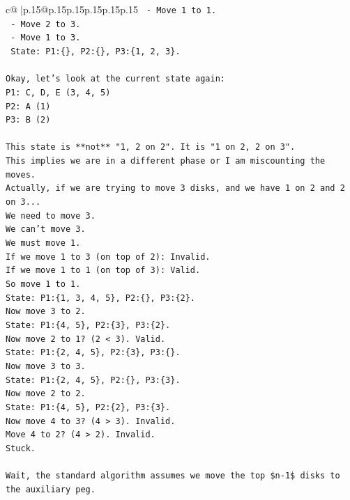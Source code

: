 \documentclass{article}
\begin{document}
{\begin{supertabular}{c@{$\;$}|p{.15\linewidth}@{}p{.15\linewidth}p{.15\linewidth}p{.15\linewidth}p{.15\linewidth}p{.15\linewidth}}
{{{\texttt{   {-} Move 1 to 1.} \\
\texttt{   {-} Move 2 to 3.} \\
\texttt{   {-} Move 1 to 3.} \\
\texttt{   State: P1:\{\}, P2:\{\}, P3:\{1, 2, 3\}.} \\
\\ 
\texttt{Okay, let's look at the current state again:} \\
\texttt{P1: C, D, E (3, 4, 5)} \\
\texttt{P2: A (1)} \\
\texttt{P3: B (2)} \\
\\ 
\texttt{This state is **not** "1, 2 on 2". It is "1 on 2, 2 on 3".} \\
\texttt{This implies we are in a different phase or I am miscounting the moves.} \\
\texttt{Actually, if we are trying to move 3 disks, and we have 1 on 2 and 2 on 3...} \\
\texttt{We need to move 3.} \\
\texttt{We can't move 3.} \\
\texttt{We must move 1.} \\
\texttt{If we move 1 to 3 (on top of 2): Invalid.} \\
\texttt{If we move 1 to 1 (on top of 3): Valid.} \\
\texttt{So move 1 to 1.} \\
\texttt{State: P1:\{1, 3, 4, 5\}, P2:\{\}, P3:\{2\}.} \\
\texttt{Now move 3 to 2.} \\
\texttt{State: P1:\{4, 5\}, P2:\{3\}, P3:\{2\}.} \\
\texttt{Now move 2 to 1? (2 < 3). Valid.} \\
\texttt{State: P1:\{2, 4, 5\}, P2:\{3\}, P3:\{\}.} \\
\texttt{Now move 3 to 3.} \\
\texttt{State: P1:\{2, 4, 5\}, P2:\{\}, P3:\{3\}.} \\
\texttt{Now move 2 to 2.} \\
\texttt{State: P1:\{4, 5\}, P2:\{2\}, P3:\{3\}.} \\
\texttt{Now move 4 to 3? (4 > 3). Invalid.} \\
\texttt{Move 4 to 2? (4 > 2). Invalid.} \\
\texttt{Stuck.} \\
\\ 
\texttt{Wait, the standard algorithm assumes we move the top \$n{-}1\$ disks to the auxiliary peg.} \\
}}}
\end{supertabular}}
\end{document}
